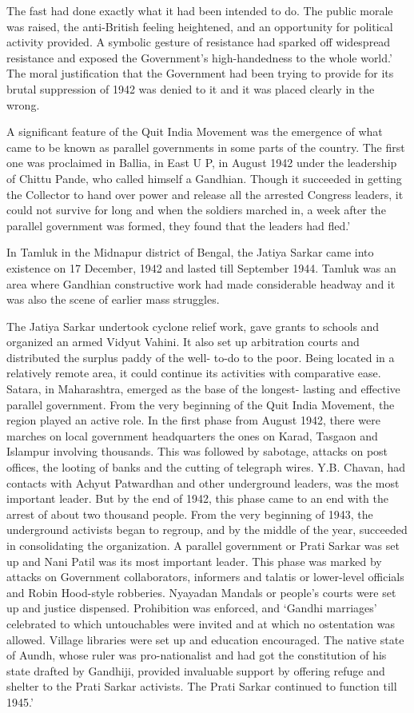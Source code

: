 The fast had done exactly what it had been intended to do. The public morale was raised, the anti-British feeling heightened, and an opportunity for political activity provided. A symbolic gesture of resistance had sparked off widespread resistance and exposed the Government's high-handedness to the whole world.' The moral justification that the Government had been trying to provide for its brutal suppression of 1942 was denied to it and it was placed clearly in the wrong.

A significant feature of the Quit India Movement was the emergence of what came to be known as parallel governments in some parts of the country. The first one was proclaimed in Ballia, in East U P, in August 1942 under the leadership of Chittu Pande, who called himself a Gandhian. Though it succeeded in getting the Collector to hand over power and release all the arrested Congress leaders, it could not survive for long and when the soldiers marched in, a week after the parallel government was formed, they found that the leaders had fled.'

In Tamluk in the Midnapur district of Bengal, the Jatiya Sarkar came into existence on 17 December, 1942 and lasted till September 1944. Tamluk was an area where Gandhian constructive work had made considerable headway and it was also the scene of earlier mass struggles.

The Jatiya Sarkar undertook cyclone relief work, gave grants to schools and organized an armed Vidyut Vahini. It also set up arbitration courts and distributed the surplus paddy of the well- to-do to the poor. Being located in a relatively remote area, it could continue its activities with comparative ease. Satara, in Maharashtra, emerged as the base of the longest- lasting and effective parallel government. From the very beginning of the Quit India Movement, the region played an active role. In the first phase from August 1942, there were marches on local government headquarters the ones on Karad, Tasgaon and Islampur involving thousands. This was followed by sabotage, attacks on post offices, the looting of banks and the cutting of telegraph wires. Y.B. Chavan, had contacts with Achyut Patwardhan and other underground leaders, was the most important leader. But by the end of 1942, this phase came to an end with the arrest of about two thousand people. From the very beginning of 1943, the underground activists began to regroup, and by the middle of the year, succeeded in consolidating the organization. A parallel government or Prati Sarkar was set up and Nani Patil was its most important leader. This phase was marked by attacks on Government collaborators, informers and talatis or lower-level officials and Robin Hood-style robberies. Nyayadan Mandals or people's courts were set up and justice dispensed. Prohibition was enforced, and `Gandhi marriages' celebrated to which untouchables were invited and at which no ostentation was allowed. Village libraries were set up and education encouraged. The native state of Aundh, whose ruler was pro-nationalist and had got the constitution of his state drafted by Gandhiji, provided invaluable support by offering refuge and shelter to the Prati Sarkar activists. The Prati Sarkar continued to function till 1945.'

